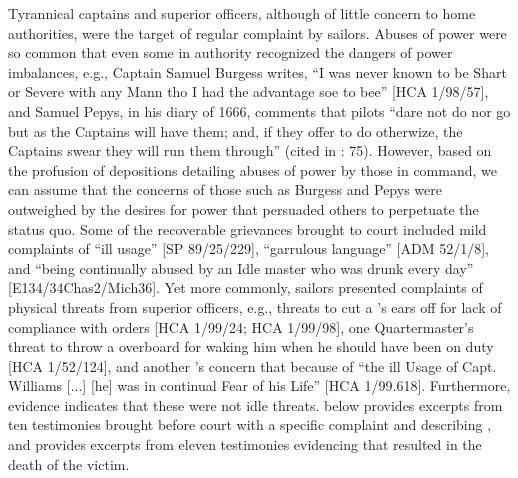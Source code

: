 Tyrannical captains and superior officers, although of little concern to home authorities, were the target of regular complaint by sailors. Abuses of power were so common that even some in authority recognized the dangers of power imbalances, e.g., Captain Samuel Burgess writes, “I was never known to be Shart or Severe with any Mann tho I had the advantage soe to bee” [HCA 1/98/57], and Samuel Pepys, in his diary of 1666, comments that pilots “dare not do nor go but as the Captains will have them; and, if they offer to do otherwize, the Captains swear they will run them through” (cited in \citealt{Lavery2009}: 75). However, based on the profusion of depositions detailing abuses of power by those in command, we can assume that the concerns of those such as Burgess and Pepys were outweighed by the desires for power that persuaded others to perpetuate the status quo. Some of the recoverable grievances brought to court included mild complaints of “ill usage” [SP 89/25/229], “garrulous language” [ADM 52/1/8], and “being continually abused by an Idle master who was drunk every day” [E134/34Chas2/Mich36]. Yet more commonly, sailors presented complaints of physical threats from superior officers, e.g., threats to cut a ’s ears off for lack of compliance with orders [HCA 1/99/24; HCA 1/99/98], one Quartermaster’s threat to throw a  overboard for waking him when he should have been on duty [HCA 1/52/124], and another ’s concern that because of “the ill Usage of Capt. Williams [...] [he] was in continual Fear of his Life” [HCA 1/99.618]. Furthermore, evidence indicates that these were not idle threats.  below provides excerpts from ten testimonies brought before court with a specific complaint and describing , and  provides excerpts from eleven testimonies evidencing  that resulted in the death of the victim.

